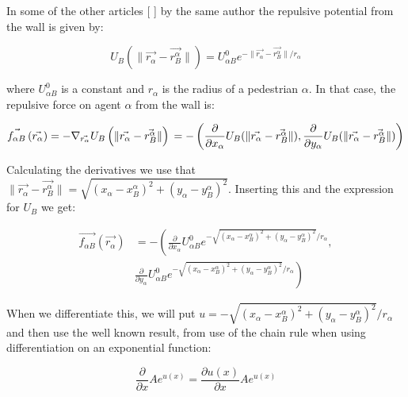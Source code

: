 In some of the other articles [ ] by the same author the repulsive potential from the 	%
wall is given by:

\begin{equation}
U_{B} \left( \| \vec{r_{\alpha}} - \vec{r_{B}^{\alpha}} \| \right) =
U^0_{\alpha B} e^{- \| \vec{r_{\alpha}} - \vec{r_{B}^{\alpha}} \| / r_{\alpha} }
\end{equation}

where $U^0_{\alpha B}$ is a constant and $r_{\alpha}$ is the radius of a pedestrian $\alpha$.
In that case, the repulsive force on agent $ \alpha $ from the wall is:

\begin{equation}
    \vec{f_{\alpha B}} \left( \vec{r_{\alpha}} \right) =
    - \nabla_{\vec{r_{\alpha}}} U_{B}
    \left( \| \vec{r_{\alpha}} - \vec{r_{B}^{\alpha}} \| \right)\\
=-\left( \frac{\partial}{\partial x_{\alpha}}U_{B}( \| \vec{r_{\alpha}} - \vec{r_{B}^{\alpha}} \|), \frac{\partial}{\partial y_{\alpha}}U_{B}( \| \vec{r_{\alpha}} - \vec{r_{B}^{\alpha}} \|)\right)
\end{equation}

Calculating the derivatives we use that
$\| \vec{r_{\alpha}} - \vec{r_{B}^{\alpha}} \|= \sqrt{(x_{\alpha}-x^{\alpha}_{B})^2+(y_{\alpha}-y^{\alpha}_B)^2}$.
Inserting this and the expression for $U_{B}$ we get:

\begin{equation}
\begin{split}
\vec{f_{\alpha B}} \left( \vec{r_{\alpha}} \right) 
& =-\left( \frac{\partial}{\partial x_{\alpha}}U^0_{\alpha B} e^{-\sqrt{(x_{\alpha}-x^{\alpha}_{B})^2+(y_{\alpha}-y^{\alpha}_B)^2}/r_{\alpha} }\right. , \\
& \left. \frac{\partial}{\partial y_{\alpha}}U^0_{\alpha B} e^{-\sqrt{(x_{\alpha}-x^{\alpha}_{B})^2+(y_{\alpha}-y^{\alpha}_B)^2}/r_{\alpha} } \right)
\end{split}
\end{equation}

When we differentiate this, we will put 
$u=-\sqrt{(x_{\alpha}-x^{\alpha}_{B})^2+(y_{\alpha}-y^{\alpha}_B)^2} / r_{\alpha}$ 
and then use the well known result, from use of the chain rule when using differentiation 
on an exponential function:

\begin{equation}
\frac{\partial }{\partial x}Ae^{u(x)}=\frac{\partial u(x)}{\partial x}Ae^{u(x)}
\end{equation}

